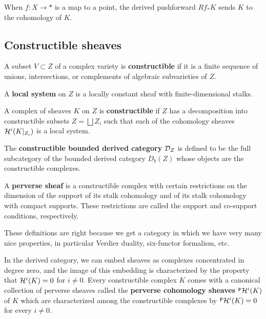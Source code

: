 \documentclass[12pt]{article}
\begin{document}
\begin{remark}
    When $f:X\to *$ is a map to a point, the derived pushforward $Rf_*K$ sends $K$ to the
    cohomology of $K$.
\end{remark}

\subsection{Constructible sheaves}
\begin{definition}
    A subset $V \subset Z$ of a complex variety is \textbf{constructible} if it is a finite
    sequence of unions, intersections, or complements of algebraic subvarieties of $Z$.

    \hfill

    A \textbf{local system} on $Z$ is a locally constant sheaf with finite-dimensional stalks.

    \hfill

    A complex of sheaves $K$ on $Z$ is \textbf{constructible} if $Z$ has 
    a decomposition into constructible subsets $Z = \bigsqcup Z_i$ such that
    each of the cohomology sheaves ${\mathcal{H}}^i(K\vert_{Z_i})$ is a local system.

    \hfill


    The \textbf{constructible bounded derived category} ${\mathcal{D}}_Z$ 
    is defined to be the full subcategory of the bounded derived category $D_b(Z)$
    whose objects are the constructible complexes. 

\hfill

    A \textbf{perverse sheaf} is a constructible complex with certain restrictions 
    on the dimension of the support of its stalk cohomology 
    and of its stalk cohomology with compact supports.
    These restrictions are called the support and 
    co-support conditions, respectively.
\end{definition}
\begin{remark}
    These definitions are right because we get a category in which 
    we have very many nice properties, in particular
    Verdier duality, six-functor formalism, etc.
\end{remark}
In the derived category, we can embed sheaves as complexes 
concentrated in degree zero, and the image of 
this embedding is characterized by the property that ${\mathcal{H}}^i(K) = 0$ for $i\neq 0$.
Every constructible complex $K$ comes with a canonical collection of perverse
sheaves called the \textbf{perverse cohomology sheaves} $^{\mathfrak{p}} {\mathcal{H}}^i(K)$ of $K$
which are characterized among the constructible complexes by $^{\mathfrak{p}} {\mathcal{H}}^i(K) = 0$
for every $i\neq 0$. 
\end{document}
